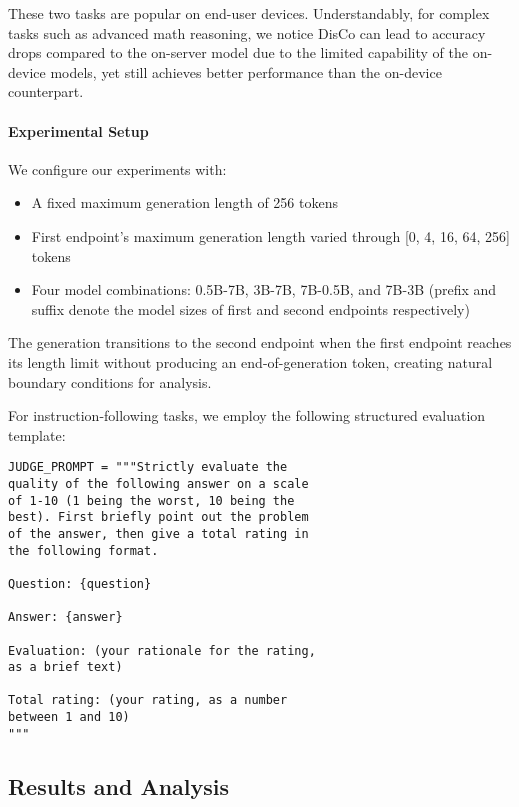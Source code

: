 These two tasks are popular on end-user devices. Understandably, for complex tasks such as advanced math reasoning, we notice DisCo can lead to accuracy drops compared to the on-server model due to the limited capability of the on-device models, yet still achieves better performance than the on-device counterpart. 

\paragraph{Experimental Setup}
We configure our experiments with:
\begin{itemize}
    \item A fixed maximum generation length of 256 tokens
    \item First endpoint's maximum generation length varied through [0, 4, 16, 64, 256] tokens
    \item Four model combinations: 0.5B-7B, 3B-7B, 7B-0.5B, and 7B-3B (prefix and suffix denote the model sizes of first and second endpoints respectively)
\end{itemize}

The generation transitions to the second endpoint when the first endpoint reaches its length limit without producing an end-of-generation token, creating natural boundary conditions for analysis.

For instruction-following tasks, we employ the following structured evaluation template:

\begin{footnotesize}
\begin{verbatim}
JUDGE_PROMPT = """Strictly evaluate the 
quality of the following answer on a scale
of 1-10 (1 being the worst, 10 being the 
best). First briefly point out the problem
of the answer, then give a total rating in
the following format.

Question: {question}

Answer: {answer}

Evaluation: (your rationale for the rating, 
as a brief text)

Total rating: (your rating, as a number 
between 1 and 10)
"""
\end{verbatim}
\end{footnotesize}


\subsection{Results and Analysis}

